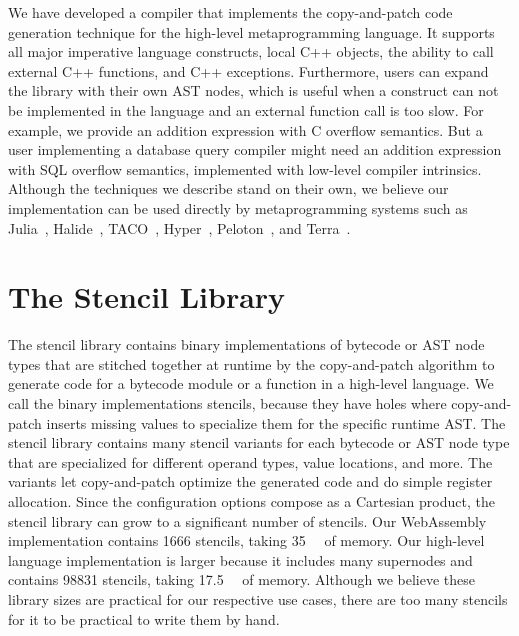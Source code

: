 \documentclass[acmsmall,nonacm,screen]{acmart}\settopmatter{printfolios=true,printccs=true,printacmref=false}
\newcommand{\cp}{copy-and-patch}
\newcommand{\stencilNum}{\num{98831}}
\newcommand{\stencilSize}{\SI{17.5}{\mega\byte}}
\newcommand{\wasmStencilNum}{\num{1666}}%
\newcommand{\wasmStencilSize}{\SI{35}{\kilo\byte}}%
\begin{document}
We have developed a compiler that implements the copy-and-patch code generation technique for the high-level metaprogramming language.
It supports all major imperative language constructs, local C++ objects, the ability to call external C++ functions, and C++ exceptions. Furthermore, users can expand the library with their own AST nodes, which is useful when a construct can not be implemented in the language and an external function call is too slow. For example, we provide an addition expression with C overflow semantics. But a user implementing a database query compiler might need an addition expression with SQL overflow semantics, implemented with low-level compiler intrinsics. Although the techniques we describe stand on their own, we believe our implementation can be used directly by metaprogramming systems such as Julia~\cite{bezanson2017}, Halide~\cite{ragan2012}, TACO~\cite{kjolstad2017}, Hyper~\cite{neumann2011}, Peloton~\cite{peloton}, and Terra~\cite{devito2013}.



\section{The Stencil Library}
\label{sec:stencil-library}
\label{sec:binary-stencils}

The stencil library contains binary implementations of bytecode or AST node types that are stitched together at runtime by the \cp{} algorithm to generate code for a bytecode module or a function in a high-level language. We call the binary implementations stencils, because they have holes where \cp{} inserts missing values to specialize them for the specific runtime AST. The stencil library contains many stencil variants for each bytecode or AST node type that are specialized for different operand types, value locations, and more. The variants let \cp{} optimize the generated code and do simple register allocation. Since the configuration options compose as a Cartesian product, the stencil library can grow to a significant number of stencils. Our WebAssembly implementation contains \wasmStencilNum{} stencils, taking \wasmStencilSize{} of memory. Our high-level language implementation is larger because it includes many supernodes and contains \stencilNum{} stencils, taking \stencilSize{} of memory. Although we believe these library sizes are practical for our respective use cases, there are too many stencils for it to be practical to write them by hand.
\end{document}
